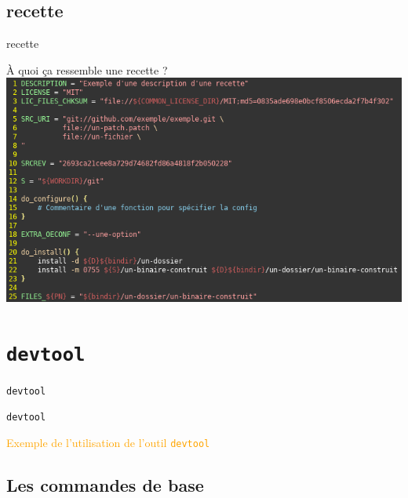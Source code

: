 \documentclass[compress]{beamer}
\begin{document}
\subsection{recette}

\begin{frame}{recette}
\begin{block}{À quoi ça ressemble une recette ?}
\includegraphics[width=\textwidth]{images/recette-yocto.png}
\end{block}
\end{frame}



\section{\texttt{devtool}}

\begin{frame}{\texttt{devtool}}
\end{frame}

\begin{frame}{\texttt{devtool}}
\begin{center}
\textcolor{orange}{\huge{Exemple de l'utilisation de l'outil \texttt{devtool}}}
\end{center}
\end{frame}

\subsection{Les commandes de base}
\end{document}

